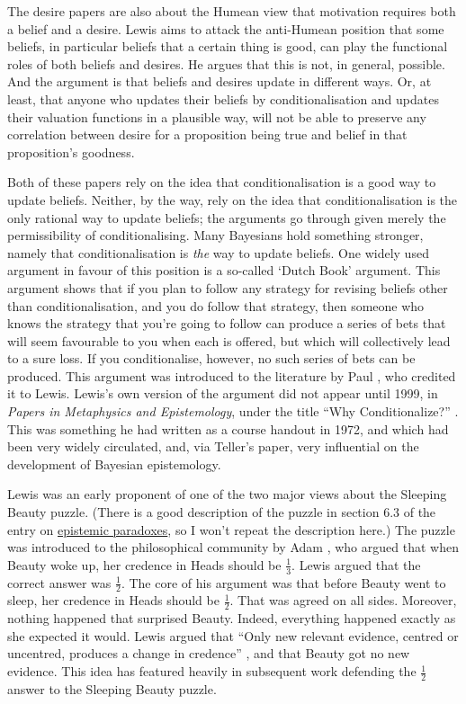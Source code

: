 The desire papers \citeyearpar{Lewis1988a, Lewis1996b} are also about the Humean view that motivation requires both a belief and a desire. Lewis aims to attack the anti-Humean position that some beliefs, in particular beliefs that a certain thing is good, can play the functional roles of both beliefs and desires. He argues that this is not, in general, possible. And the argument is that beliefs and desires update in different ways. Or, at least, that anyone who updates their beliefs by conditionalisation and updates their valuation functions in a plausible way, will not be able to preserve any correlation between desire for a proposition being true and belief in that proposition's goodness.

Both of these papers rely on the idea that conditionalisation is a good way to update beliefs. Neither, by the way, rely on the idea that conditionalisation is the only rational way to update beliefs; the arguments go through given merely the permissibility of conditionalising. Many Bayesians hold something stronger, namely that conditionalisation is \textit{the} way to update beliefs. One widely used argument in favour of this position is a so-called `Dutch Book' argument. This argument shows that if you plan to follow any strategy for revising beliefs other than conditionalisation, and you do follow that strategy, then someone who knows the strategy that you're going to follow can produce a series of bets that will seem favourable to you when each is offered, but which will collectively lead to a sure loss. If you conditionalise, however, no such series of bets can be produced. This argument was introduced to the literature by Paul \citet{Teller1973}, who credited it to Lewis. Lewis's own version of the argument did not appear until 1999, in \textit{Papers in Metaphysics and Epistemology}, under the title ``Why Conditionalize?'' \citeyearpar{Lewis1999b}. This was something he had written as a course handout in 1972, and which had been very widely circulated, and, via Teller's paper, very influential on the development of Bayesian epistemology.

Lewis was an early proponent of one of the two major views about the Sleeping Beauty puzzle. (There is a good description of the puzzle in section 6.3 of the entry on \href{http://plato.stanford.edu/epistemic-paradoxes/index.html#SleBea}{epistemic paradoxes}, so I won't repeat the description here.) The puzzle was introduced to the philosophical community by Adam \citet{Elga2000}, who argued that when Beauty woke up, her credence in Heads should be \(\frac{1}{3}\). Lewis argued that the correct answer was \(\frac{1}{2}\). The core of his argument was that before Beauty went to sleep, her credence in Heads should be \(\frac{1}{2}\). That was agreed on all sides. Moreover, nothing happened that surprised Beauty. Indeed, everything happened exactly as she expected it would. Lewis argued that ``Only new relevant evidence, centred or uncentred, produces a change in credence'' \citeyearpar[174]{Lewis2001c}, and that Beauty got no new evidence. This idea has featured heavily in subsequent work defending the \(\frac{1}{2}\) answer to the Sleeping Beauty puzzle.

